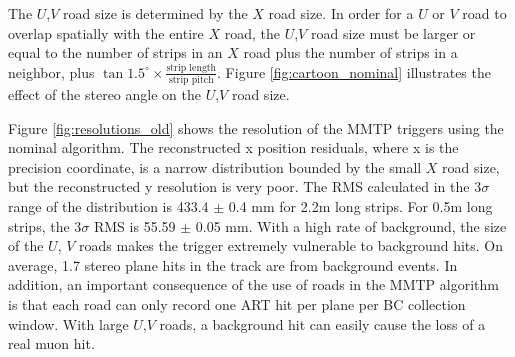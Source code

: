 \par The $U$,$V$ road size is determined by the $X$ road size. In order for a $U$ or $V$ road to overlap spatially with the entire $X$ road, the $U$,$V$ road size must be larger or equal to the number of strips in an $X$ road plus the number of strips in a neighbor, plus $\tan 1.5^\circ \times \frac{ \text{strip length} }{ \text{strip pitch} }$. Figure \ref{fig:cartoon_nominal} illustrates the effect of the stereo angle on the $U$,$V$ road size.


Figure \ref{fig:resolutions_old} shows the resolution of the MMTP triggers using the nominal algorithm. The reconstructed x position residuals, where x is the precision coordinate, is a narrow distribution bounded by the small $X$ road size, but the reconstructed y resolution is very poor. The RMS calculated in the 3$\sigma$ range of the distribution is 433.4 $\pm$ 0.4 mm for 2.2m long strips. For 0.5m long strips, the 3$\sigma$ RMS is 55.59 $\pm$ 0.05 mm. With a high rate of background, the size of the $U$, $V$ roads makes the trigger extremely vulnerable to background hits. On average, 1.7 stereo plane hits in the track are from background events. In addition, an important consequence of the use of roads in the MMTP algorithm is that each road can only record one ART hit per plane per BC collection window. With large $U$,$V$ roads, a background hit can easily cause the loss of a real muon hit. 
